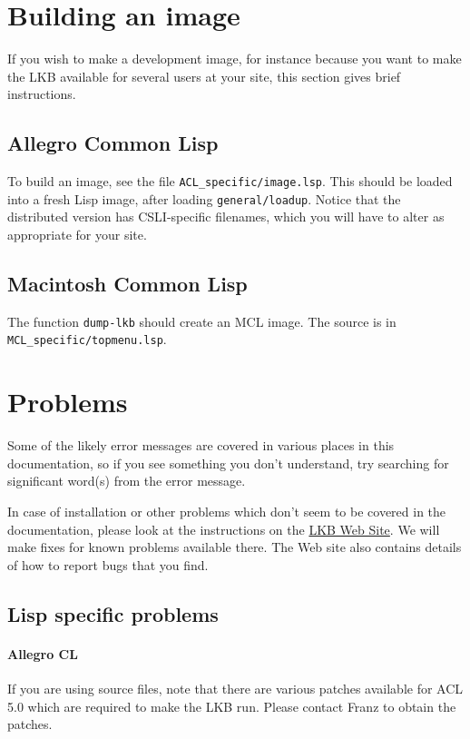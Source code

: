\documentclass[12pt]{report}
\newcommand{\filename}[1]{{\tt #1}}
\newcommand{\functionname}[1]{{\tt #1}}
\begin{document}
\section{Building an image}

If you wish to make a development image, for instance because
you want to make the LKB available for several users at your site,
this section gives brief instructions.

\subsection{Allegro Common Lisp}

To build an image, see the file \filename{ACL\_specific/image.lsp}.  This should
be loaded into a fresh Lisp image, after loading \filename{general/loadup}.
Notice that the distributed version has CSLI-specific filenames, which you will
have to alter as appropriate for your site.

\subsection{Macintosh Common Lisp}

The function \functionname{dump-lkb} should create an MCL image.  
The source is in\\ \filename{MCL\_specific/topmenu.lsp}.


\section{Problems}
\label{problems}

Some of the likely error messages are covered in various places in this
documentation, so if you see something you don't understand, try searching for
significant word(s) from the error message.

In case of installation or other problems which don't seem to be covered in the
documentation, please look at the instructions on the
\href{http://www-csli.stanford.edu/~aac/lkb.html}{LKB Web Site}.  We will make
fixes for known problems available there.  The Web site also contains details
of how to report bugs that you find.



\subsection{Lisp specific problems}

\paragraph{Allegro CL}
If you are using source files, note that there are various patches available
for ACL 5.0 which are required to make the LKB run.  Please contact Franz
to obtain the patches.
\end{document}
